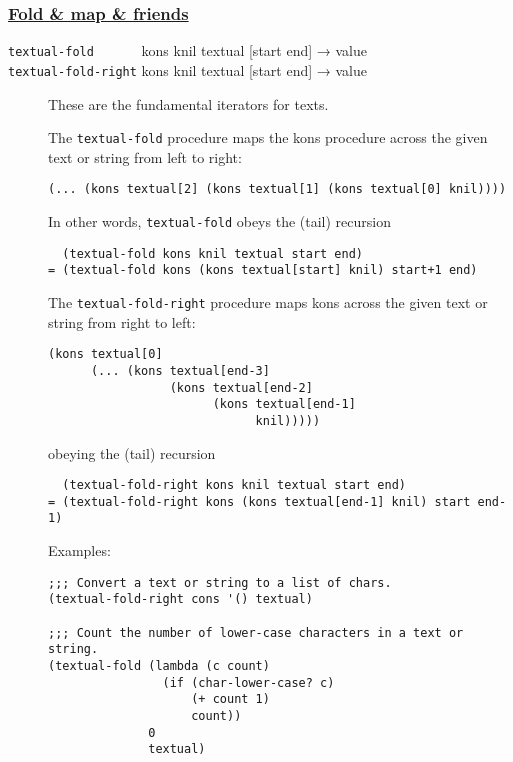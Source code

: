 \subsubsection{\texorpdfstring{\href{}{Fold \& map \&
friends}}{Fold \& map \& friends}}\label{fold-map-friends}

\begin{description}
\item[ \href{}{} \href{}{} \texttt{textual-fold~~~~~~} kons knil textual
{[}start end{]} → value\\
\texttt{textual-fold-right} kons knil textual {[}start end{]} → value ]
These are the fundamental iterators for texts.

The \texttt{textual-fold} procedure maps the kons procedure across the
given text or string from left to right:

\begin{verbatim}
(... (kons textual[2] (kons textual[1] (kons textual[0] knil))))
\end{verbatim}

In other words, \texttt{textual-fold} obeys the (tail) recursion

\begin{verbatim}
  (textual-fold kons knil textual start end)
= (textual-fold kons (kons textual[start] knil) start+1 end)
\end{verbatim}

The \texttt{textual-fold-right} procedure maps kons across the given
text or string from right to left:

\begin{verbatim}
(kons textual[0]
      (... (kons textual[end-3]
                 (kons textual[end-2]
                       (kons textual[end-1]
                             knil)))))
\end{verbatim}

obeying the (tail) recursion

\begin{verbatim}
  (textual-fold-right kons knil textual start end)
= (textual-fold-right kons (kons textual[end-1] knil) start end-1)
\end{verbatim}

Examples:

\begin{verbatim}
;;; Convert a text or string to a list of chars.
(textual-fold-right cons '() textual)

;;; Count the number of lower-case characters in a text or string.
(textual-fold (lambda (c count)
                (if (char-lower-case? c)
                    (+ count 1)
                    count))
              0
              textual)
\end{verbatim}


\end{description}
